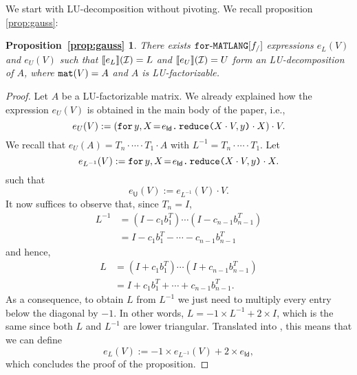 \newtheorem*{ALU}{Proposition~\ref{prop:gauss}}

We start with LU-decomposition without pivoting. We recall proposition \ref{prop:gauss}:
\begin{ALU}
  There exists $\langforf{f_/}$ expressions $e_L(V)$ and $e_U(V)$ such that
  $\sem{e_L}{\I}=L$ and $\sem{e_U}{\I}=U$ form an LU-decomposition of $A$,
  where $\conc(V)=A$ and $A$ is LU-factorizable.
\end{ALU}
\begin{proof}
	Let $A$ be a LU-factorizable matrix. We already explained how the expression 
	$e_U(V)$ is obtained in the main body of the paper, i.e., 
	$$
	e_{U}(V) :=  \left( \initf{e_{\mathsf{Id}}}{y}{X}{\red{X\cdot V}{y}\cdot X} \right) \cdot V.
	$$
	We recall that $e_U(A)=T_n\cdot\cdots\cdot T_1\cdot A$ with $L^{-1}=T_n\cdot\cdots\cdot T_1$. Let
	$$
	e_{L^{-1}}(V) :=  \initf{e_{\mathsf{Id}}}{y}{X}{\red{X\cdot V}{y}\cdot X}.
	$$
such that	$$
	e_{\mathsf{U}}(V) :=  e_{L^{-1}}(V) \cdot V.
	$$
%
%
It now suffices to observe that, since $T_n=I$,
\begin{align*}
  L^{-1}&=(I-c_1b_1^T)\cdots (I-c_{n-1}b_{n-1}^T) \\
  &=I-c_1b_1^T-\cdots - c_{n-1}b_{n-1}^T
\end{align*}
and hence,
\begin{align*}
  L&=(I+c_1b_1^T)\cdots (I+c_{n-1}b_{n-1}^T) \\
  &=I+c_1b_1^T+\cdots + c_{n-1}b_{n-1}^T.
\end{align*}
As a consequence, to obtain $L$ from $L^{-1}$ we just need to multiply every entry below the diagonal by $-1$. In other words, $L=-1\times L^{-1} + 2\times I$, which is the same since both  $L$ and $L^{-1}$ are lower triangular. Translated into \langfor, this means that we can define
$$
e_{L}(V) :=  -1\times e_{L^{-1}}(V) + 2\times e_{\mathsf{Id}},
$$
which concludes the proof of the proposition.
\end{proof}
